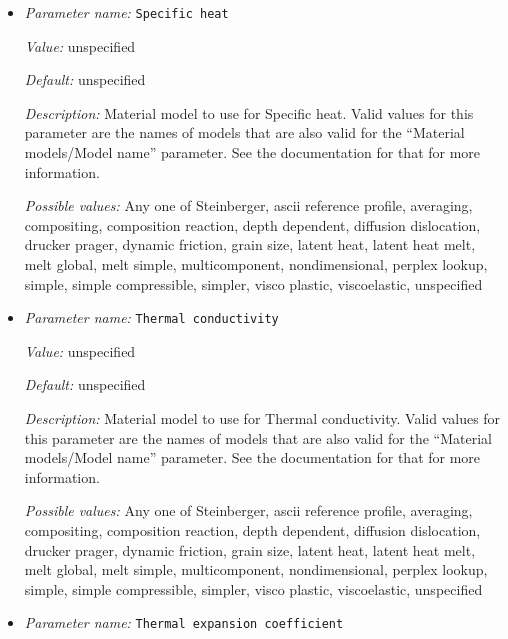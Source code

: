 \begin{itemize}
{\it Possible values:} Any one of Steinberger, ascii reference profile, averaging, compositing, composition reaction, depth dependent, diffusion dislocation, drucker prager, dynamic friction, grain size, latent heat, latent heat melt, melt global, melt simple, multicomponent, nondimensional, perplex lookup, simple, simple compressible, simpler, visco plastic, viscoelastic, unspecified
\item {\it Parameter name:} {\tt Specific heat}
\label{parameters:Material model/Compositing/Specific heat}


{\it Value:} unspecified


{\it Default:} unspecified


{\it Description:} Material model to use for Specific heat. Valid values for this parameter are the names of models that are also valid for the ``Material models/Model name'' parameter. See the documentation for that for more information.


{\it Possible values:} Any one of Steinberger, ascii reference profile, averaging, compositing, composition reaction, depth dependent, diffusion dislocation, drucker prager, dynamic friction, grain size, latent heat, latent heat melt, melt global, melt simple, multicomponent, nondimensional, perplex lookup, simple, simple compressible, simpler, visco plastic, viscoelastic, unspecified
\item {\it Parameter name:} {\tt Thermal conductivity}
\label{parameters:Material model/Compositing/Thermal conductivity}


{\it Value:} unspecified


{\it Default:} unspecified


{\it Description:} Material model to use for Thermal conductivity. Valid values for this parameter are the names of models that are also valid for the ``Material models/Model name'' parameter. See the documentation for that for more information.


{\it Possible values:} Any one of Steinberger, ascii reference profile, averaging, compositing, composition reaction, depth dependent, diffusion dislocation, drucker prager, dynamic friction, grain size, latent heat, latent heat melt, melt global, melt simple, multicomponent, nondimensional, perplex lookup, simple, simple compressible, simpler, visco plastic, viscoelastic, unspecified
\item {\it Parameter name:} {\tt Thermal expansion coefficient}
\label{parameters:Material model/Compositing/Thermal expansion coefficient}



\end{itemize}
